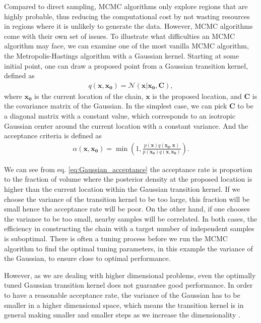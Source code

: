\documentclass[twocolumn]{aastex631}
\begin{document}
Compared to direct sampling, MCMC algorithms only explore regions that are
highly probable, thus reducing the computational cost by not wasting resources in
regions where it is unlikely to generate the data. However, MCMC algorithms come
with their own set of issues. To illustrate what difficulties an MCMC algorithm
may face, we can examine one of the most vanilla MCMC algorithm, the
Metropolis-Hastings algorithm with a Gaussian kernel. Starting at some initial
point, one can draw a proposed point from a Gaussian transition kernel, defined
as
\begin{align}
    q(\mathbf{x},\mathbf{x_0})= \mathcal{N}(\mathbf{x}|\mathbf{x_0},\mathbf{C}),
\end{align}
where $\mathbf{x_0}$ is the current location of the chain, $\mathbf{x}$ is the
proposed location, and $\mathbf{C}$ is the covariance matrix of the Gaussian. In
the simplest case, we can pick $\mathbf{C}$ to be a diagonal matrix with a
constant value, which corresponds to an isotropic Gaussian center around the
current location with a constant variance. And the acceptance criteria is
defined as
\begin{align}
\alpha(\mathbf{x},\mathbf{x_0}) = \min\left(1,\frac{p(\mathbf{x})q(\mathbf{x_0},\mathbf{x})}{p(\mathbf{x_0})q(\mathbf{x},\mathbf{x_0})}\right).
\label{eq:Gaussian_acceptance}
\end{align}

We can see from eq. \ref{eq:Gaussian_acceptance} the acceptance rate is
proportion to the fraction of volume where the posterior density at the proposed
location is higher than the current location within the Gaussian transition
kernel. If we choose the variance of the transition kernel to be too large, this
fraction will be small hence the acceptance rate will be poor. On the other
hand, if one chooses the variance to be too small, nearby samples will be
correlated. In both cases, the efficiency in constructing the chain with a
target number of independent samples is suboptimal. There is often a tuning
process before we run the MCMC algorithm to find the optimal tuning parameters,
in this example the variance of the Gaussian, to ensure close to optimal
performance.

However, as we are dealing with higher dimensional problems, even the optimally
tuned Gaussian transition kernel does not guarantee good performance. In order
to have a reasonable acceptance rate, the variance of the Gaussian has to be
smaller in a higher dimensional space, which means the transition kernel is in
general making smaller and smaller steps as we increase the dimensionality
\cite{2017arXiv170102434B}.
\end{document}
